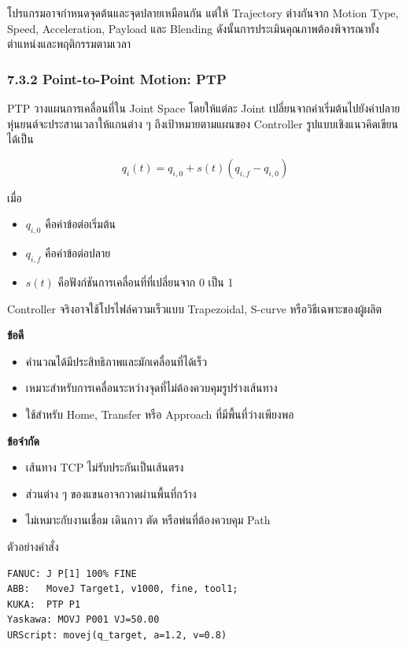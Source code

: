 โปรแกรมอาจกำหนดจุดต้นและจุดปลายเหมือนกัน แต่ให้ Trajectory ต่างกันจาก Motion Type, Speed, Acceleration, Payload และ Blending ดังนั้นการประเมินคุณภาพต้องพิจารณาทั้งตำแหน่งและพฤติกรรมตามเวลา

\subsubsection{7.3.2 Point-to-Point Motion: PTP}

PTP วางแผนการเคลื่อนที่ใน Joint Space โดยให้แต่ละ Joint เปลี่ยนจากค่าเริ่มต้นไปยังค่าปลาย หุ่นยนต์จะประสานเวลาให้แกนต่าง ๆ ถึงเป้าหมายตามแผนของ Controller รูปแบบเชิงแนวคิดเขียนได้เป็น

\[
q_i(t)=q_{i,0}+s(t)(q_{i,f}-q_{i,0})
\]

เมื่อ

\begin{itemize}
    \item $q_{i,0}$ คือค่าข้อต่อเริ่มต้น
    \item $q_{i,f}$ คือค่าข้อต่อปลาย
    \item $s(t)$ คือฟังก์ชันการเคลื่อนที่ที่เปลี่ยนจาก 0 เป็น 1
\end{itemize}

Controller จริงอาจใช้โปรไฟล์ความเร็วแบบ Trapezoidal, S-curve หรือวิธีเฉพาะของผู้ผลิต

\textbf{ข้อดี}

\begin{itemize}
    \item คำนวณได้มีประสิทธิภาพและมักเคลื่อนที่ได้เร็ว
    \item เหมาะสำหรับการเคลื่อนระหว่างจุดที่ไม่ต้องควบคุมรูปร่างเส้นทาง
    \item ใช้สำหรับ Home, Transfer หรือ Approach ที่มีพื้นที่ว่างเพียงพอ
\end{itemize}

\textbf{ข้อจำกัด}

\begin{itemize}
    \item เส้นทาง TCP ไม่รับประกันเป็นเส้นตรง
    \item ส่วนต่าง ๆ ของแขนอาจกวาดผ่านพื้นที่กว้าง
    \item ไม่เหมาะกับงานเชื่อม เดินกาว ตัด หรือพ่นที่ต้องควบคุม Path
\end{itemize}

ตัวอย่างคำสั่ง

\begin{verbatim}
FANUC: J P[1] 100% FINE
ABB:   MoveJ Target1, v1000, fine, tool1;
KUKA:  PTP P1
Yaskawa: MOVJ P001 VJ=50.00
URScript: movej(q_target, a=1.2, v=0.8)
\end{verbatim}

